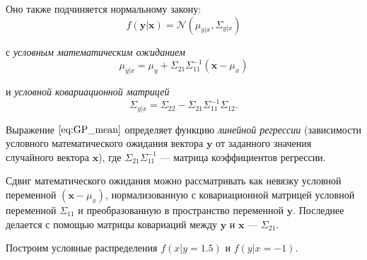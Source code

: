 \documentclass[11pt,a4paper]{article}
\begin{document}
Оно также подчиняется нормальному закону:
\[ f(\mathbf{y}|\mathbf{x}) = \mathcal{N}(\mu_{y|x}, \Sigma_{y|x}) \]

с \emph{условным математическим ожиданием}
\[ \mu_{y|x} = \mu_y + \Sigma_{21}\Sigma_{11}^{-1}(\mathbf{x}-\mu_x) \label{eq:GP_mean}\tag{2} \]

и \emph{условной ковариационной матрицей}
\[ \Sigma_{y|x} = \Sigma_{22} - \Sigma_{21} \Sigma_{11}^{-1} \Sigma_{12}. \label{eq:GP_cov}\tag{3} \]

Выражение \(\eqref{eq:GP_mean}\) определяет функцию \emph{линейной
регрессии} (зависимости условного математического ожидания вектора
\(\mathbf{y}\) от заданного значения случайного вектора \(\mathbf{x}\)),
где \(\Sigma_{21}\Sigma_{11}^{-1}\) --- матрица коэффициентов регрессии.

Сдвиг математического ожидания можно рассматривать как невязку условной
переменной \((\mathbf{x}-\mu_x)\), нормализованную с ковариационной
матрицей условной переменной \(\Sigma_{11}\) и преобразованную в
пространство переменной \(\mathbf{y}\). Последнее делается с помощью
матрицы ковариаций между \(\mathbf{y}\) и \(\mathbf{x}\) ---
\(\Sigma_{21}\).

Построим условные распределения \(f(x|y= 1.5)\) и \(f(y|x=-1)\).
\end{document}
